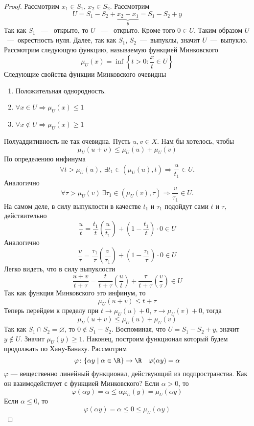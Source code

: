 \begin{proof}
	Рассмотрим $x_1 \in S_1$, $x_2 \in S_2$. Рассмотрим 
	$$
	U = S_1 - S_2 +\underbrace{x_2 - x_1}_y = S_1 - S_2 + y
	$$
	Так как $S_1$ ~---~ открыто, то $U$ ~---~ открыто. Кроме того $ 0 \in U$. Таким образом $U$ ~---~окрестность нуля. Далее, так как $S_1$, $S_2$~---~выпуклы, значит $U$~---~выпукло. Рассмотрим следующую функцию, называемую функцией Минковского
	$$
	\mu_U(x) = \inf\left\{t > 0 \colon \frac{x}{t} \in U\right\}
	$$
	Следующие свойства функции Минковского очевидны 
	\begin{enumerate}
		\item Положительная однородность.
		\item $\forall x\in U \Rightarrow \mu_U(x) \leq 1$
		\item $\forall x \notin U \Rightarrow \mu_U(x) \geq 1$
	\end{enumerate}
	Полуаддитивность не так очевидна. Пусть $u, v \in X$. Нам бы хотелось, чтобы 
	$$
	\mu_U(u + v) \leq \mu_U(u) + \mu_U(v)
	$$
	По определению инфинума $$\forall t > \mu_U(u), \ \exists t_1 \in(\mu_U(u), t) \Rightarrow \dfrac{u}{t_1} \in U.$$ Аналогично $$\forall \tau > \mu_U(v)  \ \exists \tau_1 \in (\mu_U(v), \tau) \Rightarrow \dfrac{v}{\tau_1} \in U.$$
	На самом деле, в силу выпуклости в качестве $t_1$ и $\tau_1$ подойдут сами $t$ и $\tau$, действительно 
	$$
	\frac{u}{t} = \frac{t_1}{t}\left(\frac{u}{t_1}\right) + \left(1 - \frac{t_1}{t}\right)\cdot 0 \in U
	$$
	Аналогично
	$$ 
	\frac{v}{\tau} = \frac{\tau_1}{\tau}\left(\frac{v}{\tau_1}\right) + \left(1 - \frac{\tau_1}{\tau}\right)\cdot 0 \in U
	$$
	Легко видеть, что в силу выпуклости
	$$
	\frac{u + v}{t + \tau} = \frac{t}{t + \tau}\left(\frac{u}{t}\right) + \frac{\tau}{t+\tau}\left(\frac{v}{\tau}\right) \in U
	$$
	Так как функция Минковского это инфинум, то 
	$$
	\mu_U(u + v) \leq t + \tau
	$$
	Теперь перейдем к пределу при $t \to \mu_U(u) + 0$, $\tau\to\mu_U(v) + 0$, тогда 
	$$
	\mu_U(u + v) \leq \mu_U(u) + \mu_U(v)
	$$
	Так как $S_1 \cap S_2 = \varnothing$, то $ 0 \notin S_1 - S_2$. Воспоминая, что $U = S_1 - S_2 + y$, значит $y \notin U$. Значит $\mu_U(y) \geq 1$. Наконец, построим функционал который будем продолжать по Хану-Банаху. Рассмотрим 
	$$
	\varphi \colon \{\alpha y \mid \alpha \in \R \} \to \R \quad \varphi(\alpha y) = \alpha
	$$
	$\varphi$ --- вещественно линейный функционал, действующий из подпространства. Как он взаимодействует с функцией Минковского? Если $\alpha > 0$, то 
	$$
	\varphi(\alpha y) = \alpha \leq \alpha \mu_U(y) = \mu_U(\alpha y)
	$$
	Если $\alpha \leq 0$, то 
	$$
	\varphi(\alpha y) = \alpha \leq 0 \leq \mu_U(\alpha y)
$$
\end{proof}

